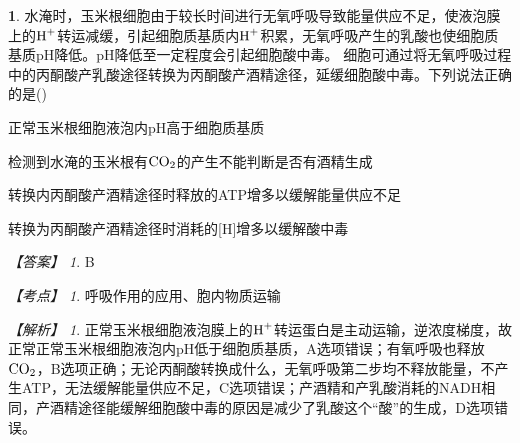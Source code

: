 \documentclass[UTF8, 10pt, a4paper, oneside]{ctexart}
\theoremstyle{definition}
\newtheorem{exercise}{}
\theoremstyle{remark}
\newtheorem*{answer}{【答案】}
\newtheorem*{point}{【考点】}      %
\newtheorem*{explanation}{【解析】}     %
\theoremstyle{plain}
\begin{document}
\begin{exercise}
    水淹时，玉米根细胞由于较长时间进行无氧呼吸导致能量供应不足，使液泡膜上的$\ce{H+}$转运减缓，引起细胞质基质内$\ce{H+}$积累，无氧呼吸产生的乳酸也使细胞质基质pH降低。pH降低至一定程度会引起细胞酸中毒。
    细胞可通过将无氧呼吸过程中的丙酮酸产乳酸途径转换为丙酮酸产酒精途径，延缓细胞酸中毒。下列说法正确的是\quad(\quad)
    \begin{adjustwidth}{2em}{}
        \begin{asparaenum}[A. ]
            \item 正常玉米根细胞液泡内pH高于细胞质基质
            \item 检测到水淹的玉米根有$\ce{CO2}$的产生不能判断是否有酒精生成
            \item 转换内丙酮酸产酒精途径时释放的ATP增多以缓解能量供应不足
            \item 转换为丙酮酸产酒精途径时消耗的[H]增多以缓解酸中毒
        \end{asparaenum}
    \end{adjustwidth}
    \begin{answer}
        B
    \end{answer}
    \begin{point}
        呼吸作用的应用、胞内物质运输
    \end{point}
    \begin{explanation}
        正常玉米根细胞液泡膜上的$\ce{H+}$转运蛋白是主动运输，逆浓度梯度，故正常正常玉米根细胞液泡内pH低于细胞质基质，A选项错误；有氧呼吸也释放$\ce{CO2}$，B选项正确；无论丙酮酸转换成什么，无氧呼吸第二步均不释放能量，不产生ATP，无法缓解能量供应不足，C选项错误；产酒精和产乳酸消耗的NADH相同，产酒精途径能缓解细胞酸中毒的原因是减少了乳酸这个“酸”的生成，D选项错误。
    \end{explanation}
\end{exercise}
\end{document}
